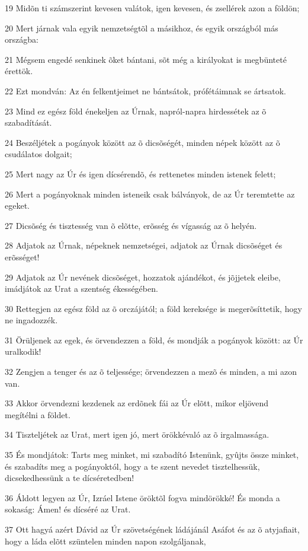 \par 19 Midõn ti számszerint kevesen valátok, igen kevesen, és zsellérek azon a földön;
\par 20 Mert járnak vala egyik nemzetségtõl a másikhoz, és egyik országból más országba:
\par 21 Mégsem engedé senkinek õket bántani, sõt még a királyokat is megbünteté  érettök.
\par 22 Ezt mondván: Az én felkentjeimet ne bántsátok, prófétáimnak se ártsatok.
\par 23 Mind ez egész föld énekeljen az Úrnak, napról-napra hirdessétek az õ szabadítását.
\par 24 Beszéljétek a pogányok között az õ dicsõségét, minden népek között az õ csudálatos dolgait;
\par 25 Mert nagy az Úr és igen dícsérendõ, és rettenetes minden istenek felett;
\par 26 Mert a pogányoknak minden isteneik csak bálványok, de az Úr teremtette az egeket.
\par 27 Dicsõség és tisztesség van õ elõtte, erõsség és vígasság az õ helyén.
\par 28 Adjatok az Úrnak, népeknek nemzetségei, adjatok az Úrnak dicsõséget és erõsséget!
\par 29 Adjatok az Úr nevének dicsõséget, hozzatok ajándékot, és jõjjetek eleibe, imádjátok az Urat a szentség ékességében.
\par 30 Rettegjen az egész föld az õ orczájától; a föld kereksége is megerõsíttetik, hogy ne ingadozzék.
\par 31 Örüljenek az egek, és örvendezzen a föld, és mondják a pogányok között: az Úr uralkodik!
\par 32 Zengjen a tenger és az õ teljessége; örvendezzen a mezõ és minden, a mi azon van.
\par 33 Akkor örvendezni kezdenek az erdõnek fái az Úr elõtt, mikor eljövend megítélni a földet.
\par 34 Tiszteljétek az Urat, mert igen jó, mert örökkévaló az õ irgalmassága.
\par 35 És mondjátok: Tarts meg minket, mi szabadító Istenünk, gyûjts össze minket, és szabadíts meg a pogányoktól, hogy a te szent nevedet tisztelhessük, dicsekedhessünk a te dícséretedben!
\par 36 Áldott legyen az Úr, Izráel Istene öröktõl fogva mindörökké! És monda a sokaság: Ámen! és dícséré az Urat.
\par 37 Ott hagyá azért Dávid az Úr szövetségének ládájánál Asáfot és az õ atyjafiait, hogy a láda elõtt szüntelen minden napon szolgáljanak,
